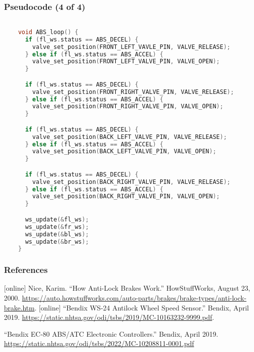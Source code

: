 \documentclass{beamer}
\begin{document}
\begin{frame}[fragile]
  \frametitle{Pseudocode (4 of 4)}
    \begin{lstlisting}[language=c++, basicstyle=\tiny, columns=fullflexible]

    void ABS_loop() {
      if (fl_ws.status == ABS_DECEL) {
        valve_set_position(FRONT_LEFT_VAVLE_PIN, VALVE_RELEASE);
      } else if (fl_ws.status == ABS_ACCEL) {
        valve_set_position(FRONT_LEFT_VALVE_PIN, VALVE_OPEN);
      }

      if (fl_ws.status == ABS_DECEL) {
        valve_set_position(FRONT_RIGHT_VALVE_PIN, VALVE_RELEASE);
      } else if (fl_ws.status == ABS_ACCEL) {
        valve_set_position(FRONT_RIGHT_VALVE_PIN, VALVE_OPEN);
      }

      if (fl_ws.status == ABS_DECEL) {
        valve_set_position(BACK_LEFT_VALVE_PIN, VALVE_RELEASE);
      } else if (fl_ws.status == ABS_ACCEL) {
        valve_set_position(BACK_LEFT_VALVE_PIN, VALVE_OPEN);
      }

      if (fl_ws.status == ABS_DECEL) {
        valve_set_position(BACK_RIGHT_VALVE_PIN, VALVE_RELEASE);
      } else if (fl_ws.status == ABS_ACCEL) {
        valve_set_position(BACK_RIGHT_VALVE_PIN, VALVE_OPEN);
      }

      ws_update(&fl_ws);
      ws_update(&fr_ws);
      ws_update(&bl_ws);
      ws_update(&br_ws);
    }
  \end{lstlisting}
\end{frame}

\begin{frame}
  \frametitle{References}
  \begin{thebibliography}{9}
    [online]
    Nice, Karim. ``How Anti-Lock Brakes Work.'' HowStuffWorks, August 23, 2000.
    \url{https://auto.howstuffworks.com/auto-parts/brakes/brake-types/anti-lock-brake.htm}.
    [online]
    ``Bendix WS-24 Antilock Wheel Speed Sensor.'' Bendix, April 2019.
      \url{https://static.nhtsa.gov/odi/tsbs/2019/MC-10163232-9999.pdf}.

      ``Bendix EC-80 ABS/ATC Electronic Controllers.'' Bendix, April 2019.
      \url{https://static.nhtsa.gov/odi/tsbs/2022/MC-10208811-0001.pdf}
  \end{thebibliography}
\end{frame}
\end{document}
